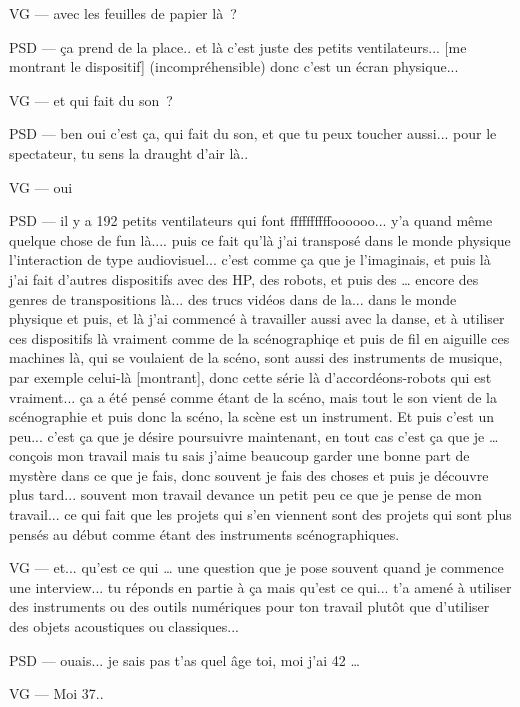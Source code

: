 VG —  avec les feuilles de papier là ? 

PSD — ça prend de la place.. et là c'est juste des petits ventilateurs... [me montrant le dispositif] (incompréhensible) donc c'est un écran physique... 

VG —  et qui fait du son ? 

PSD — ben oui c'est ça, qui fait du son, et que tu peux toucher aussi... pour le spectateur, tu sens la draught d'air là..   

VG —  oui 

PSD — il y a 192 petits ventilateurs qui font ffffffffffoooooo... y'a quand même quelque chose de fun là.... puis ce fait qu'là j'ai transposé dans le monde physique l'interaction de type audiovisuel... c'est comme ça que je l'imaginais, et puis là j'ai fait d'autres dispositifs avec des HP, des robots, et puis des … encore des genres de transpositions là... des trucs vidéos dans de la... dans le monde physique et puis, et là j'ai commencé à travailler aussi avec la danse, et à utiliser ces dispositifs là vraiment comme de la scénographiqe et puis de fil en aiguille ces machines là, qui se voulaient de la scéno, sont aussi des instruments de musique, par exemple celui-là [montrant], donc cette série là d'accordéons-robots qui est vraiment... ça a été pensé comme étant de la scéno, mais tout le son vient de la scénographie et puis donc la scéno, la scène est un instrument. Et puis c'est un peu... c'est ça que je désire poursuivre maintenant, en tout cas c'est ça que je … conçois mon travail mais tu sais j'aime beaucoup garder une bonne part de mystère dans ce que je fais, donc souvent je fais des choses et puis je découvre plus tard... souvent mon travail devance un petit peu ce que je pense de mon travail... ce qui fait que les projets qui s'en viennent sont des projets qui sont plus pensés au début comme étant des instruments scénographiques. 

VG —  et... qu'est ce qui … une question que je pose souvent quand je commence une interview... tu réponds en partie à ça mais qu'est ce qui... t'a amené à utiliser des instruments ou des outils numériques pour ton travail plutôt que d'utiliser des objets acoustiques ou classiques... 

PSD — ouais... je sais pas t'as quel âge toi, moi j'ai 42 … 

VG —  Moi 37.. 

